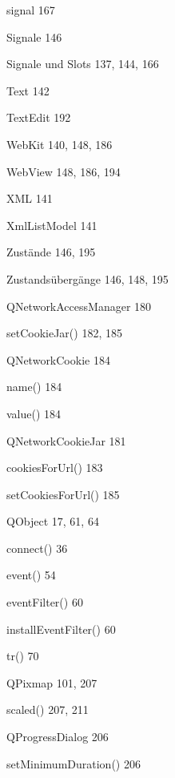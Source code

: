\documentclass{book}
\renewcommand\subitem{\par}
\begin{document}
\begin{multicols}{2}
\begin{osp-index}
    \subitem signal\hspace{1mm} 167
    \subitem Signale\hspace{1mm} 146
    \subitem Signale und Slots\hspace{1mm} 137, 144, 166
    \subitem Text\hspace{1mm} 142
    \subitem TextEdit\hspace{1mm} 192
    \subitem WebKit\hspace{1mm} 140, 148, 186
    \subitem WebView\hspace{1mm} 148, 186, 194
    \subitem XML\hspace{1mm} 141
    \subitem XmlListModel\hspace{1mm} 141
    \subitem Zust\"ande\hspace{1mm} 146, 195
    \subitem Zustands\"uberg\"ange\hspace{1mm} 146, 148, 195
  \item QNetworkAccessManager\hspace{1mm} 180
    \subitem setCookieJar()\hspace{1mm} 182, 185
  \item QNetworkCookie\hspace{1mm} 184
    \subitem name()\hspace{1mm} 184
    \subitem value()\hspace{1mm} 184
  \item QNetworkCookieJar\hspace{1mm} 181
    \subitem cookiesForUrl()\hspace{1mm} 183
    \subitem setCookiesForUrl()\hspace{1mm} 185
  \item QObject\hspace{1mm} 17, 61, 64
    \subitem connect()\hspace{1mm} 36
    \subitem event()\hspace{1mm} 54
    \subitem eventFilter()\hspace{1mm} 60
    \subitem installEventFilter()\hspace{1mm} 60
    \subitem tr()\hspace{1mm} 70
  \item QPixmap\hspace{1mm} 101, 207
    \subitem scaled()\hspace{1mm} 207, 211
  \item QProgressDialog\hspace{1mm} 206
    \subitem setMinimumDuration()\hspace{1mm} 206

\end{osp-index}
\end{multicols}
\end{document}
